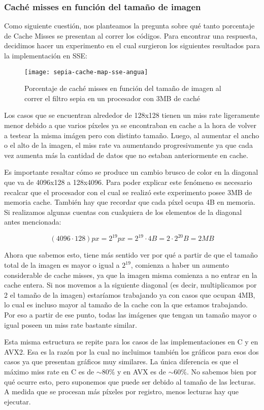 \subsubsection{Caché misses en función del tamaño de imagen}

Como siguiente cuestión, nos planteamos la pregunta sobre qué tanto porcentaje de Cache Misses se presentan al correr los códigos. Para encontrar una respuesta, decidimos hacer un experimento en el cual surgieron los siguientes resultados para la implementación en SSE:

\begin{figure}[h]
    \centering
    \texttt{[image: sepia-cache-map-sse-angua]}
    \caption{Porcentaje de caché misses en función del tamaño de imagen al correr el filtro sepia en un procesador con 3MB de caché}
    \label{fig:sepia-cache-map-sse-angua}
\end{figure}

Los casos que se encuentran alrededor de 128x128 tienen un miss rate ligeramente menor debido a que varios píxeles ya se encontraban en cache a la hora de volver a testear la misma imágen pero con distinto tamaño. Luego, al aumentar el ancho o el alto de la imagen, el miss rate va aumentando progresivamente ya que cada vez aumenta más la cantidad de datos que no estaban anteriormente en cache.

Es importante resaltar cómo se produce un cambio brusco de color en la diagonal que va de 4096x128 a 128x4096. Para poder explicar este fenómeno es necesario recalcar que el procesador con el cual se realizó este experimento posee 3MB de memoria cache. También hay que recordar que cada píxel ocupa 4B en memoria. Si realizamos algunas cuentas con cualquiera de los elementos de la diagonal antes mencionada:

$$(4096 \cdot 128) px = 2^{19} px = 2^{19} \cdot 4 B = 2 \cdot 2^{20} B = 2MB$$

Ahora que sabemos esto, tiene más sentido ver por qué a partir de que el tamaño total de la imagen es mayor o igual a $2^{19}$, comienza a haber un aumento considerable de cache misses, ya que la imagen misma comienza a no entrar en la cache entera. Si nos movemos a la siguiente diagonal (es decir, multiplicamos por 2 el tamaño de la imagen) estaríamos trabajando ya con casos que ocupan 4MB, lo cual es incluso mayor al tamaño de la cache con la que estamos trabajando. Por eso a partir de ese punto, todas las imágenes que tengan un tamaño mayor o igual poseen un miss rate bastante similar.

Esta misma estructura se repite para los casos de las implementaciones en C y en AVX2. Esa es la razón por la cual no incluimos también los gráficos para esos dos casos ya que presentan gráficos muy similares. La única diferencia es que el máximo miss rate en C es de $\sim80\%$ y en AVX es de $\sim60\%$. No sabemos bien por qué ocurre esto, pero suponemos que puede ser debido al tamaño de las lecturas. A medida que se procesan más píxeles por registro, menos lecturas hay que ejecutar.

